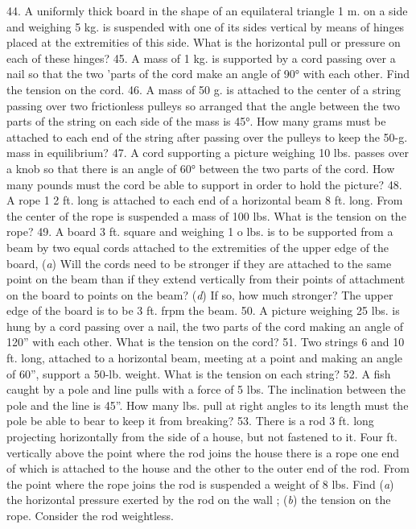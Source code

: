 44. A uniformly thick board in the shape of an equilateral triangle 1 m. on a side and weighing 5 kg. is suspended with one of its sides vertical by means of hinges placed at the extremities of this side. What is the horizontal pull or pressure on each of these hinges?
45. A mass of 1 kg. is supported by a cord passing over a nail so that the two 'parts of the cord make an angle of 90° with each other. Find the tension on the cord.
46. A mass of 50 g. is attached to the center of a string passing over two frictionless pulleys so arranged that the angle between the two parts of the string on each side of the mass is 45°. How many grams must be attached to each end of the string after passing over the pulleys to keep the 50-g. mass in equilibrium?
47. A cord supporting a picture weighing 10 lbs. passes over a knob so that there is an angle of 60° between the two parts of the cord. How many pounds must the cord be able to support in order to hold the picture?
48. A rope 1 2 ft. long is attached to each end of a horizontal beam 8 ft. long. From the center of the rope is suspended a mass of 100 lbs. What is the tension on the rope?
49. A board 3 ft. square and weighing 1 o lbs. is to be supported from a beam by two equal cords attached to the extremities of the upper edge of the board, (\emph{a}) Will the cords need to be stronger if they are attached to the same point on the beam than if they extend vertically from their points of attachment on the board to points on the beam? (\emph{d}) If so, how much stronger? The upper edge of the board is to be 3 ft. frpm the beam.
50. A picture weighing 25 lbs. is hung by a cord passing over a nail, the two parts of the cord making an angle of 120'' with each other. What is the tension on the cord?
51. Two strings 6 and 10 ft. long, attached to a horizontal beam, meeting at a point and making an angle of 60'', support a 50-lb. weight. What is the tension on each string?
52. A fish caught by a pole and line pulls with a force of 5 lbs. The inclination between the pole and the line is 45''. How many lbs. pull at right angles to its length must the pole be able to bear to keep it from breaking?
53. There is a rod 3 ft. long projecting horizontally from the side of a house, but not fastened to it. Four ft. vertically above the point where the rod joins the house there is a rope one end of which is attached to the house and the other to the outer end of the rod. From the point where the rope joins the rod is suspended a weight of 8 lbs. Find (\emph{a}) the horizontal pressure exerted by the rod on the wall ; (\emph{b}) the tension on the rope. Consider the rod weightless.
